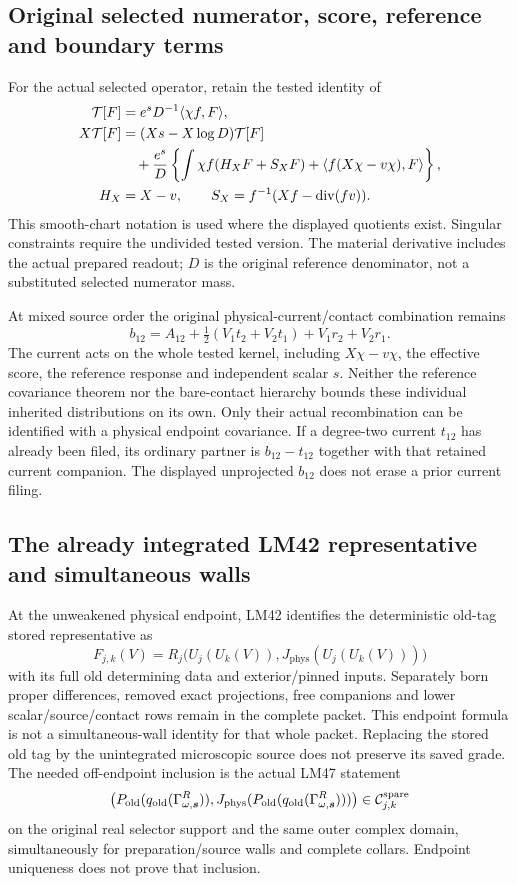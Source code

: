 \documentclass[11pt,letterpaper]{article}
\theoremstyle{remark}\newtheorem{remark}[theorem]{Remark}
\providecommand{\mathscr}{\mathcal}
\begin{document}
\subsection{Original selected numerator, score, reference and boundary terms}

For the actual selected operator, retain the tested identity of~\cite[\S4.3]{RS}
\begin{align}\label{eq:response}
 \mathscr T[F]&=e^sD^{-1}\langle\chi f,F\rangle,\\
 X\mathscr T[F]
 &=(Xs-X\log D)\mathscr T[F]\nonumber\\
 &\quad+\frac{e^s}{D}\left\{\int\chi f(H_XF+S_XF)
          +\langle f(X\chi-v\chi),F\rangle\right\},\nonumber\\
 H_X&=X-v,
 \qquad S_X=f^{-1}(Xf-\diver(fv)).\nonumber
\end{align}
This smooth-chart notation is used where the displayed quotients exist. Singular constraints require the undivided tested version. The material derivative includes the actual prepared readout; \(D\) is the original reference denominator, not a substituted selected numerator mass.

At mixed source order the original physical-current/contact combination remains
\[
 b_{12}=A_{12}+\tfrac12(V_1t_2+V_2t_1)+V_1r_2+V_2r_1.
\]
The current acts on the whole tested kernel, including \(X\chi-v\chi\), the effective score, the reference response and independent scalar \(s\). Neither the reference covariance theorem nor the bare-contact hierarchy bounds these individual inherited distributions on its own. Only their actual recombination can be identified with a physical endpoint covariance.
If a degree-two current \(t_{12}\) has already been filed, its ordinary partner is \(b_{12}-t_{12}\) together with that retained current companion. The displayed unprojected \(b_{12}\) does not erase a prior current filing.

\subsection{The already integrated LM42 representative and simultaneous walls}

At the unweakened physical endpoint, LM42 identifies the deterministic old-tag stored representative as
\[
 F_{j,k}(V)=R_j\bigl(U_j(U_k(V)),
 J_{\mathrm{phys}}(U_j(U_k(V)))\bigr)
\]
with its full old determining data and exterior/pinned inputs. Separately born proper differences, removed exact projections, free companions and lower scalar/source/contact rows remain in the complete packet. This endpoint formula is not a simultaneous-wall identity for that whole packet. Replacing the stored old tag by the unintegrated microscopic source does not preserve its saved grade. The needed off-endpoint inclusion is the actual LM47 statement
\[
 \bigl(P_{\rm old}(q_{\rm old}(\Gamma^R_{\omega,\boldsymbol s})),
 J_{\rm phys}(P_{\rm old}(q_{\rm old}(\Gamma^R_{\omega,\boldsymbol s})))\bigr)
 \in\mathcal C^{\rm spare}_{j,k}
\]
on the original real selector support and the same outer complex domain, simultaneously for preparation/source walls and complete collars. Endpoint uniqueness does not prove that inclusion.
\end{document}
